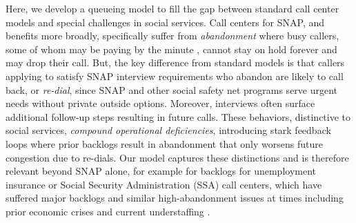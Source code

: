 \documentclass[manuscript,screen,authorversion]{acmart}
\begin{document}
Here, we develop a queueing model to fill the gap between standard call center models and special challenges in social services. %
Call centers for SNAP, and benefits more broadly, specifically suffer from \textit{abandonment} where busy callers, some of whom may be paying by the minute \citep{howe_new_2025}, cannot stay on hold forever and may drop their call. But, the key difference from standard models is that callers applying to satisfy SNAP interview requirements who abandon are likely to call back, or \textit{re-dial}, since SNAP and other social safety net programs serve urgent needs without private outside options. Moreover, interviews often surface additional follow-up steps resulting in future calls. These behaviors, distinctive to social services, \textit{compound operational deficiencies}, introducing stark feedback loops where prior backlogs result in abandonment that only worsens future congestion due to re-dials. Our model captures these distinctions and is therefore relevant beyond SNAP alone, for example for backlogs for unemployment insurance or Social Security Administration (SSA) call centers, which have suffered major backlogs and similar high-abandonment issues at times including prior economic crises \citep{pahlka2023recoding,Coffey_2017,ho2025evaluation} and current understaffing \citep{Rain_Natanson_25AD}.

\end{document}
